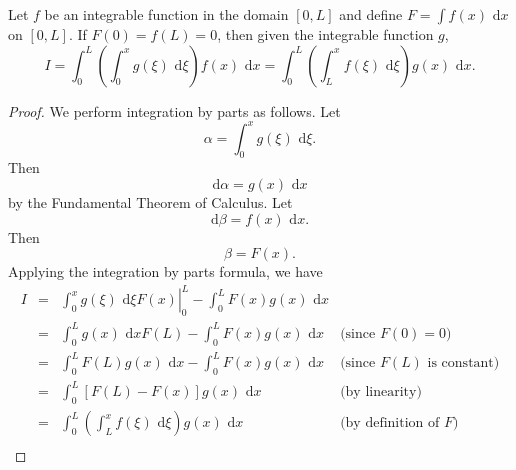 \begin{lemma}
Let $f$ be an integrable function in the domain $[0,L]$ and define $F = \int f(x)\text{ d}x$ on $[0,L]$. If $F(0) = f(L) = 0$, then given the integrable function $g$,
\begin{equation}
I = \int_0^L\left(\int_0^xg(\xi)\text{ d}\xi\right)f(x)\text{ d}x = \int_0^L\left(\int_L^xf(\xi)\text{ d}\xi\right)g(x)\text{ d}x.
\end{equation}
\label{lem:switch.integrals}
\end{lemma}
\begin{proof}
We perform integration by parts as follows. Let
\[\alpha = \int_0^xg(\xi)\text{ d}\xi.\]
Then
\[\text{d}\alpha = g(x)\text{ d}x\]
by the Fundamental Theorem of Calculus. Let
\[\text{d}\beta = f(x)\text{ d}x.\]
Then
\[\beta = F(x).\]
Applying the integration by parts formula, we have
\begin{equation*}
\begin{array}{rcll}
I &=&  \left.\int_0^xg(\xi)\text{ d}\xi F(x)\right|_0^L - \int_0^LF(x)g(x)\text{ d}x & \\
  &=&  \int_0^Lg(x)\text{ d}xF(L) - \int_0^LF(x)g(x)\text{ d}x &\text{(since $F(0)=0$)} \\
  &=&  \int_0^LF(L)g(x)\text{ d}x - \int_0^LF(x)g(x)\text{ d}x &\text{(since $F(L)$ is constant)} \\
  &=&  \int_0^L[F(L)-F(x)]g(x)\text{ d}x &\text{(by linearity)} \\
  &=&  \int_0^L\left(\int_L^xf(\xi)\text{ d}\xi\right)g(x)\text{ d}x &\text{(by definition of $F$)} \\
\end{array}
\end{equation*}
\end{proof}

